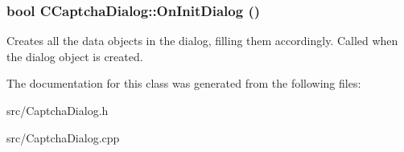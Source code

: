 \subsubsection[{OnInitDialog}]{\setlength{\rightskip}{0pt plus 5cm}bool CCaptchaDialog::OnInitDialog ()\hspace{0.3cm}{\ttfamily  [protected, virtual]}}\label{classCCaptchaDialog_a2a215b96e4b82f2e626931fc374c25d6}


Creates all the data objects in the dialog, filling them accordingly. Called when the dialog object is created. 

The documentation for this class was generated from the following files:\begin{DoxyCompactItemize}
\item 
src/CaptchaDialog.h\item 
src/CaptchaDialog.cpp\end{DoxyCompactItemize}

